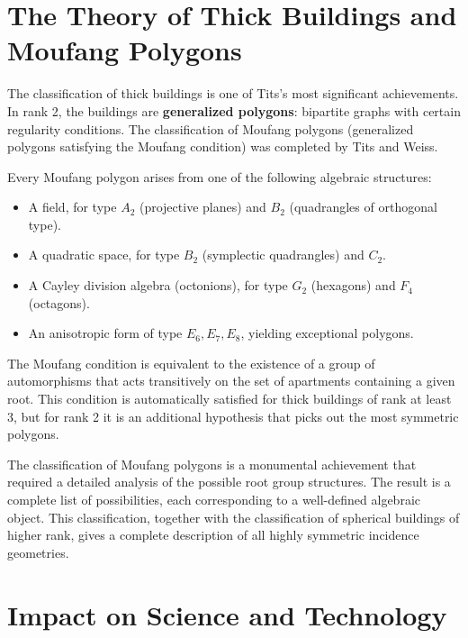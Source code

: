 \section{The Theory of Thick Buildings and Moufang Polygons}

The classification of thick buildings is one of Tits's most significant achievements. In rank 2, the buildings are \textbf{generalized polygons}: bipartite graphs with certain regularity conditions. The classification of Moufang polygons (generalized polygons satisfying the Moufang condition) was completed by Tits and Weiss.

\begin{theorem}
Every Moufang polygon arises from one of the following algebraic structures:
\begin{itemize}
    \item A field, for type \(A_2\) (projective planes) and \(B_2\) (quadrangles of orthogonal type).
    \item A quadratic space, for type \(B_2\) (symplectic quadrangles) and \(C_2\).
    \item A Cayley division algebra (octonions), for type \(G_2\) (hexagons) and \(F_4\) (octagons).
    \item An anisotropic form of type \(E_6, E_7, E_8\), yielding exceptional polygons.
\end{itemize}
\end{theorem}

The Moufang condition is equivalent to the existence of a group of automorphisms that acts transitively on the set of apartments containing a given root. This condition is automatically satisfied for thick buildings of rank at least 3, but for rank 2 it is an additional hypothesis that picks out the most symmetric polygons.

The classification of Moufang polygons is a monumental achievement that required a detailed analysis of the possible root group structures. The result is a complete list of possibilities, each corresponding to a well-defined algebraic object. This classification, together with the classification of spherical buildings of higher rank, gives a complete description of all highly symmetric incidence geometries.

\section{Impact on Science and Technology}

